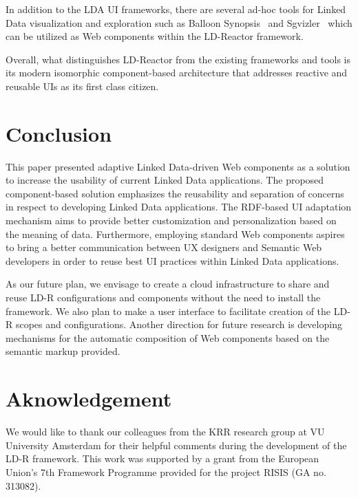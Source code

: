 \documentclass{acm_proc_article-sp}
\begin{document}
In addition to the LDA UI frameworks, there are several ad-hoc tools for Linked Data visualization and exploration such as Balloon Synopsis~\cite{BalloonSchlegelWSGK14} and Sgvizler~\cite{Sgvizler} which can  be utilized as Web components within the LD-Reactor framework. 

Overall, what distinguishes LD-Reactor from the existing frameworks and tools is its modern isomorphic component-based architecture that addresses reactive and reusable UIs as its first class citizen.

\section{Conclusion}
This paper presented adaptive Linked Data-driven Web components as a solution to increase the usability of current Linked Data applications.
The proposed component-based solution emphasizes the reusability and separation of concerns in respect to developing Linked Data applications.
The RDF-based UI adaptation mechanism aims to provide better customization and personalization based on the meaning of data.
Furthermore, employing standard Web components aspires to bring a better communication between UX designers and Semantic Web developers in order to reuse best UI practices within Linked Data applications.

As our future plan, we envisage to create a cloud infrastructure to share and reuse LD-R configurations and components without the need to install the framework.
We also plan to make a user interface to facilitate creation of the LD-R scopes and configurations.
Another direction for future research is developing mechanisms for the automatic composition of Web components based on the semantic markup provided.


\section{Aknowledgement}
We would like to thank our colleagues from the KRR research group at VU University Amsterdam for their helpful comments during the development of the LD-R framework. This work was supported by a grant from the European Union's 7th Framework Programme provided for the project RISIS (GA no. 313082).



\end{document}
